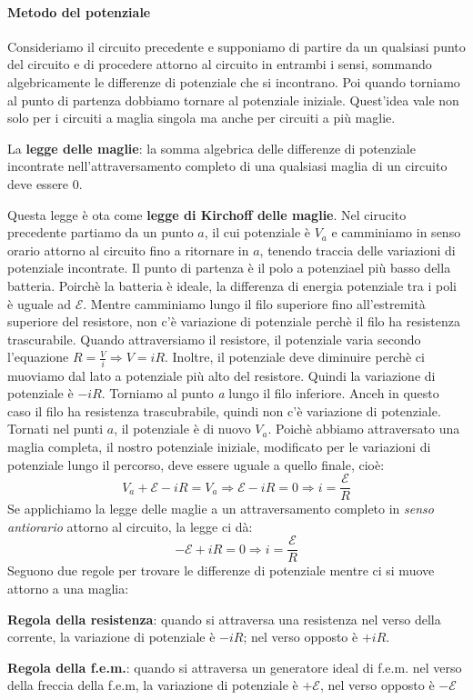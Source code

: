 \documentclass[12pt]{report}
\begin{document}
	\paragraph{Metodo del potenziale}
	Consideriamo il circuito precedente e supponiamo di partire da un qualsiasi punto del circuito e di procedere attorno al circuito in entrambi i sensi, sommando algebricamente le differenze di potenziale che si incontrano. Poi quando torniamo al punto di partenza dobbiamo tornare al potenziale iniziale. Quest'idea vale non solo per i circuiti a maglia singola ma anche per circuiti a più maglie.
	\begin{center}
		La \textbf{legge delle maglie}: la somma algebrica delle differenze di potenziale incontrate nell'attraversamento completo di una qualsiasi maglia di un circuito deve essere 0.
	\end{center}
	Questa legge è ota come \textbf{legge di Kirchoff delle maglie}. Nel cirucito precedente partiamo da un punto $a$, il cui potenziale è $V_a$ e camminiamo in senso orario attorno al circuito fino a ritornare in $a$, tenendo traccia delle variazioni di potenziale incontrate. Il punto di partenza è il polo a potenziael più basso della batteria. Poirchè la batteria è ideale, la differenza di energia potenziale tra i poli è uguale ad $\mathcal{E}$. Mentre camminiamo lungo il filo superiore fino all'estremità superiore del resistore, non c'è variazione di potenziale perchè il filo ha resistenza trascurabile. Quando attraversiamo il resistore, il potenziale varia secondo l'equazione $R = \frac{V}{i} \Rightarrow V = iR$. Inoltre, il potenziale deve diminuire perchè ci muoviamo dal lato a potenziale più alto del resistore. Quindi la variazione di potenziale è $-iR$. Torniamo al punto \textit{a} lungo il filo inferiore. Anceh in questo caso il filo ha resistenza trascubrabile, quindi non c'è variazione di potenziale. Tornati nel punti $a$, il potenziale è di nuovo $V_a$. Poichè abbiamo attraversato una maglia completa, il nostro potenziale iniziale, modificato per le variazioni di potenziale lungo il percorso, deve essere uguale a quello finale, cioè:
	\[
	V_a + \mathcal{E} - iR = V_a \Rightarrow \mathcal{E} - iR = 0 \Rightarrow i = \frac{\mathcal{E}}{{R}}
	\]
	Se applichiamo la legge delle maglie a un attraversamento completo in \textit{senso antiorario} attorno al circuito, la legge ci dà:
	\[
	-\mathcal{E} + iR = 0 \Rightarrow i = \frac{\mathcal{E}}{R}
	\]
	Seguono due regole per trovare le differenze di potenziale mentre ci si muove attorno a una maglia:
	\begin{center}
		\textbf{Regola della resistenza}: quando si attraversa una resistenza nel verso della corrente, la variazione di potenziale è $-iR$; nel verso opposto è $+iR$.
	\end{center}
	\begin{center}
		\textbf{Regola della f.e.m.}: quando si attraversa un generatore ideal di f.e.m. nel verso della freccia della f.e.m, la variazione di potenziale è $+\mathcal{E}$, nel verso opposto è $-\mathcal{E}$
	\end{center}
\end{document}
